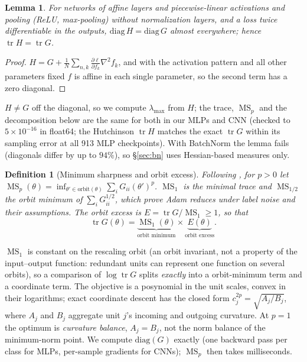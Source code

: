 \documentclass[10pt,twocolumn]{article}
\newtheorem{lemma}{Lemma}
\newtheorem{definition}{Definition}
\theoremstyle{remark}
\newcommand{\tr}{\operatorname{tr}}
\newcommand{\MS}{\operatorname{MS}}
\begin{document}
\begin{lemma}\label{lem:diag}
For networks of affine layers and piecewise-linear activations and pooling (ReLU, max-pooling) without normalization layers, and a loss twice differentiable in the outputs, $\mathrm{diag}\,H=\mathrm{diag}\,G$ almost everywhere; hence $\tr H=\tr G$.
\end{lemma}
\begin{proof}
$H=G+\frac1N\sum_{n,k}\frac{\partial\ell}{\partial f_k}\nabla^2f_k$, and with the activation pattern and all other parameters fixed $f$ is affine in each single parameter, so the second term has a zero diagonal.
\end{proof}
$H\ne G$ off the diagonal, so we compute $\lambda_{\max}$ from $H$; the trace, $\MS_p$ and the decomposition below are the same for both in our MLPs and CNN (checked to $5\times10^{-16}$ in float64; the Hutchinson $\tr H$ matches the exact $\tr G$ within its sampling error at all 913 MLP checkpoints). With BatchNorm the lemma fails (diagonals differ by up to $94\%$), so \S\ref{sec:bn} uses Hessian-based measures only.

\begin{definition}[Minimum sharpness and orbit excess]
Following \citet{ibayashi2021minimum}, for $p>0$ let $\MS_p(\theta)=\inf_{\theta'\in\mathrm{orbit}(\theta)}\sum_iG_{ii}(\theta')^{p}$. $\MS_1$ is the minimal trace and $\MS_{1/2}$ the orbit minimum of $\sum_iG_{ii}^{1/2}$, which \citet{li2025adam} prove Adam reduces under label noise and their assumptions. The \emph{orbit excess} is $E=\tr G/\MS_1\ge1$, so that
\begin{equation}\label{eq:factor}
\tr G(\theta)=\underbrace{\MS_1(\theta)}_{\text{orbit minimum}}\times\underbrace{E(\theta)}_{\text{orbit excess}}.
\end{equation}
\end{definition}
$\MS_1$ is constant on the rescaling orbit (an orbit invariant, not a property of the input--output function: redundant units can represent one function on several orbits), so a comparison of $\log\tr G$ splits \emph{exactly} into a orbit-minimum term and a coordinate term. The objective is a posynomial in the unit scales, convex in their logarithms; exact coordinate descent has the closed form $c_j^{2p}=\sqrt{A_j/B_j}$, where $A_j$ and $B_j$ aggregate unit $j$'s incoming and outgoing curvature. At $p=1$ the optimum is \emph{curvature balance}, $A_j=B_j$, not the norm balance of the minimum-norm point. We compute $\mathrm{diag}(G)$ exactly (one backward pass per class for MLPs, per-sample gradients for CNNs); $\MS_p$ then takes milliseconds.
\end{document}
